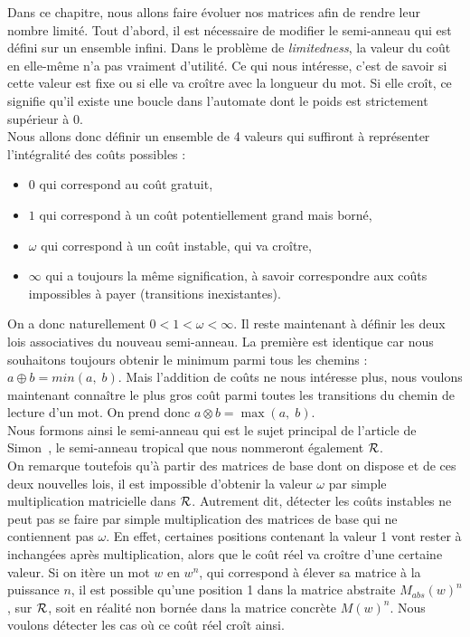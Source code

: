 \documentclass[12pt]{memoir}
\begin{document}
Dans ce chapitre, nous allons faire évoluer nos matrices afin de rendre leur nombre limité. Tout d'abord, il est nécessaire de modifier le semi-anneau qui est défini sur un ensemble infini. Dans le problème de \emph{limitedness}, la valeur du coût en elle-même n'a pas vraiment d'utilité. Ce qui nous intéresse, c'est de savoir si cette valeur est fixe ou si elle va croître avec la longueur du mot. Si elle croît, ce signifie qu'il existe une boucle dans l'automate dont le poids est strictement supérieur à 0.\\
Nous allons donc définir un ensemble de 4 valeurs qui suffiront à représenter l'intégralité des coûts possibles : 
\begin{itemize}
\item $0$ qui correspond au coût gratuit,
\item $1$ qui correspond à un coût potentiellement grand mais borné,
\item $\omega$ qui correspond à un coût instable, qui va croître,
\item $\infty$ qui a toujours la même signification, à savoir correspondre aux
  coûts impossibles à payer (transitions inexistantes).
\end{itemize}
$\ $\\
On a donc naturellement $0 < 1 < \omega < \infty$. Il reste maintenant à définir les deux lois associatives du nouveau semi-anneau. La première est identique car nous souhaitons toujours obtenir le minimum parmi tous les chemins : $a \oplus b = min(a,\;b)$. Mais l'addition de coûts ne nous intéresse plus, nous voulons maintenant connaître le plus gros coût parmi toutes les transitions du chemin de lecture d'un mot. On prend donc $a \otimes b = \max(a,\;b)$.\\
Nous formons ainsi le semi-anneau qui est le sujet principal de l'article de Simon~\cite{Simon:Semigroups-Matrices-over-Tropical:1994:a}, le semi-anneau tropical que nous nommeront également $\mathcal{R}$.\\

On remarque toutefois qu'à partir des matrices de base dont on dispose et de
ces deux nouvelles lois, il est impossible d'obtenir la valeur $\omega$ par
simple multiplication matricielle dans $\mathcal{R}$. Autrement dit, détecter les coûts
instables ne peut pas se faire par simple multiplication des matrices de base
qui ne contiennent pas $\omega$. En effet, certaines positions contenant la
valeur 1 vont rester à inchangées après multiplication, alors que le coût réel
va croître d'une certaine valeur. Si on itère un mot $w$ en $w^n$, qui
correspond à élever sa matrice à la puissance $n$, il est possible
qu'une position 1 dans la matrice abstraite $M_{abs}(w)^n$, sur $\mathcal{R}$, soit en réalité
non bornée dans la matrice concrète $M(w)^n$. Nous voulons détecter les cas où ce coût réel croît ainsi.
\end{document}
